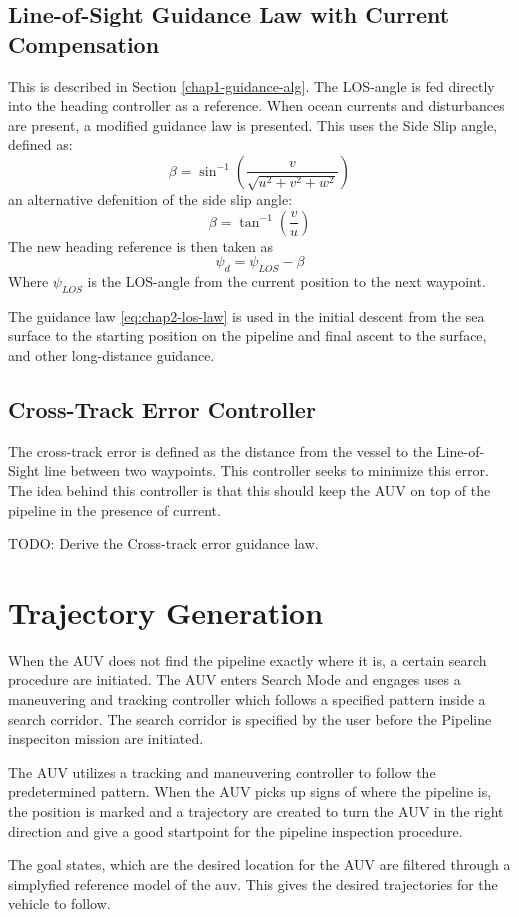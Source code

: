 	\subsection{Line-of-Sight Guidance Law with Current Compensation}
		This is described in Section \ref{chap1-guidance-alg}. The LOS-angle is fed directly into the 
		heading controller as a reference. When ocean currents and disturbances are present, a modified 
		guidance law is presented. This uses the Side Slip angle, defined as:
		\begin{equation}
			\label{eq:chap2-sideslip}
			\beta = \sin^{-1} ( \frac{v}{\sqrt{u^2 + v^2 + w^2}})
		\end{equation}
		an alternative defenition of the side slip angle:
		\begin{equation*}
			\beta = \tan^{-1} (\frac{v}{u})
		\end{equation*}
		The new heading reference is then taken as
		\begin{equation}
			\label{eq:chap2-los-law}
			\psi_d = \psi_{LOS} - \beta
		\end{equation}
		Where $\psi_{LOS}$ is the LOS-angle from the current position to the next waypoint.
		
		The guidance law \eqref{eq:chap2-los-law} is used in the initial descent from the sea surface to the 
		starting position on the pipeline and final ascent to the surface, and other long-distance guidance.
		
	\subsection{Cross-Track Error Controller}
		The cross-track error is defined as the distance from the vessel to the Line-of-Sight line between 
		two waypoints. This controller seeks to minimize this error. The idea behind this controller is that 
		this should keep the AUV on top of the pipeline in the presence of current.
		
		TODO: Derive the Cross-track error guidance law. \cite{cross-track}
		
		
	
\section{Trajectory Generation}
	

	When the AUV does not find the pipeline exactly where it is, a certain search procedure are initiated.
	The AUV enters Search Mode and engages uses a maneuvering and tracking controller which follows a
	specified pattern inside a search corridor. The search corridor is specified by the user before the
	Pipeline inspeciton mission are initiated. 

	The AUV utilizes a tracking and maneuvering controller to follow the predetermined pattern. When the
	AUV picks up signs of where the pipeline is, the position is marked and a trajectory are created to
	turn the AUV in the right direction and give a good startpoint for the pipeline inspection procedure. 
	
	The goal states, which are the desired location for the AUV are filtered through a simplyfied
	reference model of the auv. This gives the desired trajectories for the vehicle to follow.

